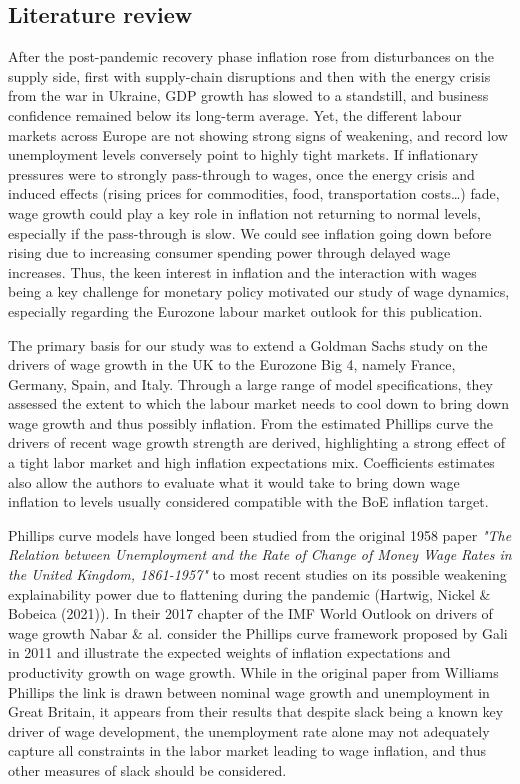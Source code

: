\subsection{Literature review}

\quad After the post-pandemic recovery phase inflation rose from disturbances on the supply side, first with supply-chain disruptions and then with the energy crisis from the war in Ukraine, GDP growth has slowed to a standstill, and business confidence remained below its long-term average. 
Yet, the different labour markets across Europe are not showing strong signs of weakening, and record low unemployment levels conversely point to highly tight markets. 
If inflationary pressures were to strongly pass-through to wages, once the energy crisis and induced effects (rising prices for commodities, food, transportation costs\dots) fade, wage growth could play a key role in inflation not returning to normal levels, especially if the pass-through is slow. 
We could see inflation going down before rising due to increasing consumer spending power through delayed wage increases. Thus, the keen interest in inflation and the interaction with wages being a key challenge for monetary policy motivated our study of wage dynamics, especially regarding the Eurozone labour market outlook for this publication. 

The primary basis for our study was to extend a Goldman Sachs study on the drivers of wage growth in the UK to the Eurozone Big 4, namely France, Germany, Spain, and Italy. 
Through a large range of model specifications, they assessed the extent to which the labour market needs to cool down to bring down wage growth and thus possibly inflation.
From the estimated Phillips curve the drivers of recent wage growth strength are derived, highlighting a strong effect of a tight labor market and high inflation expectations mix.
Coefficients estimates also allow the authors to evaluate what it would take to bring down wage inflation to levels usually considered compatible with the BoE inflation target.

Phillips curve models have longed been studied from the original 1958 paper \textit{"The Relation between Unemployment and the Rate of Change of Money Wage Rates in the United Kingdom, 1861-1957"}\cite{labour0} to most recent studies on its possible weakening explainability power due to flattening during the pandemic (Hartwig, Nickel \& Bobeica (2021)\cite{labour1}). 
In their 2017 chapter of the IMF World Outlook on drivers of wage growth Nabar \& al.\cite{labour2} consider the Phillips curve framework proposed by Gali in 2011\cite{labour3} and illustrate the expected weights of inflation expectations and productivity growth on wage growth. 
While in the original paper from Williams Phillips the link is drawn between nominal wage growth and unemployment in Great Britain, it appears from their results that despite slack being a known key driver of wage development, the unemployment rate alone may not adequately capture all constraints in the labor market leading to wage inflation, and thus other measures of slack should be considered.

